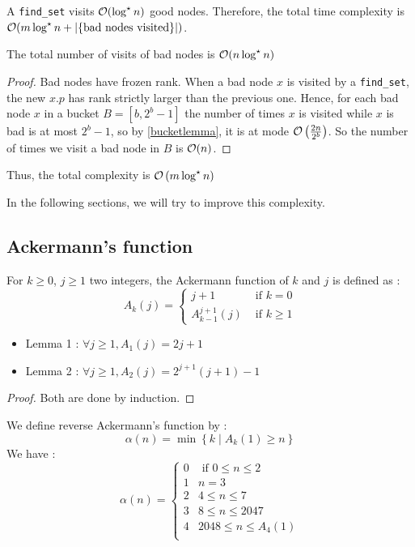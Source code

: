 \documentclass{cours}
\begin{document}
A \texttt{find_set} visits $\mathcal{O}(\log^{\star} n)$ good nodes. Therefore, the total time complexity is $\mathcal{O}(m\log^{\star} n + \left|\left\{\text{bad nodes visited}\right\}\right|)$. 

\begin{proposition}
    The total number of visits of bad nodes is $\mathcal{O}(n\log^{\star} n)$
\end{proposition}
\begin{proof}
    Bad nodes have frozen rank. When a bad node $x$ is visited by a \texttt{find_set}, the new $x.p$ has rank strictly larger than the previous one. Hence, for each bad node $x$ in a bucket $B = \left[b, 2^{b}-1\right]$ the number of times $x$ is visited while $x$ is bad is at most $2^{b} - 1$, so by \ref{bucketlemma}, it is at mode $\mathcal{O}\left(\frac{2n}{2^{b}}\right)$. So the number of times we visit a bad node in $B$ is $\mathcal{O}(n)$.
\end{proof}

Thus, the total complexity is $\mathcal{O}\left(m \log^{\star} n\right)$

In the following sections, we will try to improve this complexity. 
\subsection{Ackermann's function}
\begin{definition}
    For $k \geq 0$, $j \geq 1$ two integers, the Ackermann function of $k$ and $j$ is defined as : 
    \[
        A_{k}(j) = \begin{cases}
            j + 1 &\text{ if } k = 0 \\
            A_{k - 1}^{j + 1}(j) &\text{ if } k \geq 1
        \end{cases}
    \]
\end{definition}

\begin{proposition}[Properties]
    \begin{itemize}
        \item Lemma 1 : $\forall j \geq 1, A_{1}(j) = 2j + 1$
        \item Lemma 2 : $\forall j \geq 1, A_{2}(j) = 2^{j + 1}(j + 1) - 1$
    \end{itemize}
\end{proposition}
\begin{proof}
    Both are done by induction.
\end{proof}

\begin{definition}
    We define reverse Ackermann's function by : 
    \[
        \alpha(n) = \min \left\{k \mid A_{k}(1) \geq n\right\}
    \]
    We have : 
    \[
        \alpha(n) = \begin{cases}
            0 & \text{ if } 0 \leq n \leq 2\\
            1 & n = 3\\
            2 & 4 \leq n \leq 7\\
            3 & 8 \leq n \leq 2047\\
            4 & 2048 \leq n \leq A_{4}(1)\\
        \end{cases}    
    \]
\end{definition}
\end{document}
